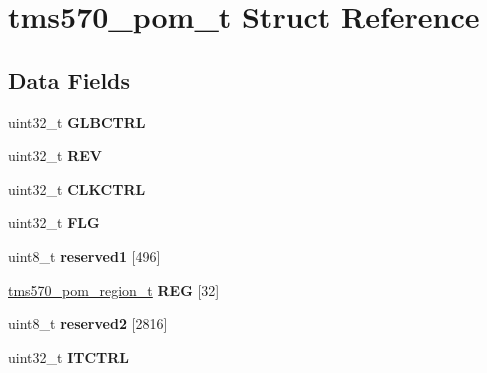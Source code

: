 \hypertarget{structtms570__pom__t}{}\section{tms570\+\_\+pom\+\_\+t Struct Reference}
\label{structtms570__pom__t}
\subsection*{Data Fields}
\begin{DoxyCompactItemize}
\item 
\mbox{\label{structtms570__pom__t_aa360a2f9ad7335a2c3adb0723d63eb63}} 
uint32\+\_\+t {\bfseries G\+L\+B\+C\+T\+RL}
\item 
\mbox{\label{structtms570__pom__t_acd5a101cf93a2cac79bb19151000dae4}} 
uint32\+\_\+t {\bfseries R\+EV}
\item 
\mbox{\label{structtms570__pom__t_a5828807f0cbc676ced1f7239dc8f9700}} 
uint32\+\_\+t {\bfseries C\+L\+K\+C\+T\+RL}
\item 
\mbox{\label{structtms570__pom__t_af13ef933a0fa36debf0cfd408c901446}} 
uint32\+\_\+t {\bfseries F\+LG}
\item 
\mbox{\label{structtms570__pom__t_aab654439fa061bd090f7143ee0dcbd9e}} 
uint8\+\_\+t {\bfseries reserved1} \mbox{[}496\mbox{]}
\item 
\mbox{\label{structtms570__pom__t_a05660eae53f6cdca98e868bed5c6052a}} 
\mbox{\hyperlink{structtms570__pom__region__t}{tms570\+\_\+pom\+\_\+region\+\_\+t}} {\bfseries R\+EG} \mbox{[}32\mbox{]}
\item 
\mbox{\label{structtms570__pom__t_a60167ad77731145b7f4cd47fcd88dd83}} 
uint8\+\_\+t {\bfseries reserved2} \mbox{[}2816\mbox{]}
\item 
\mbox{\label{structtms570__pom__t_a0016c21291cc9cee13ad371d0f5d18cb}} 
uint32\+\_\+t {\bfseries I\+T\+C\+T\+RL}
\item 
\mbox{\label{structtms570__pom__t_af44d8526d15ffd882c28f964dae84d3f}} 

\end{DoxyCompactItemize}
